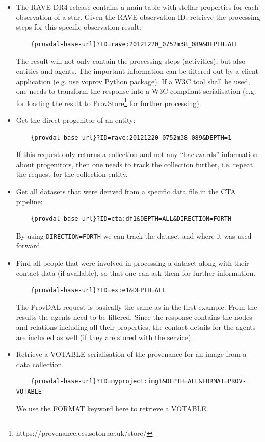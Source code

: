 \begin{itemize}
\item The RAVE DR4 release contains a main table with stellar properties for each observation of a star. Given the RAVE observation ID, retrieve the processing steps
for this specific observation result:

	\begin{verbatim}
	{provdal-base-url}?ID=rave:20121220_0752m38_089&DEPTH=ALL
	\end{verbatim}

The result will not only contain the processing steps (activities), but also entities and agents. The important information can be filtered out by a client application (e.g. use voprov Python package). If a W3C tool shall be used, one needs to transform the response into a W3C compliant serialisation (e.g. for loading the result to ProvStore\footnote{https://provenance.ecs.soton.ac.uk/store/} for further processing).

\item Get the direct progenitor of an entity:
	\begin{verbatim}
	{provdal-base-url}?ID=rave:20121220_0752m38_089&DEPTH=1
	\end{verbatim}
	If this request only returns a collection and not any ``backwards'' information about progenitors, then
	one needs to track the collection further, i.e. repeat the request for the collection entity.

\item Get all datasets that were derived from a specific data file in the CTA pipeline:
	\begin{verbatim}
	{provdal-base-url}?ID=cta:df1&DEPTH=ALL&DIRECTION=FORTH
	\end{verbatim}
	By using \texttt{DIRECTION=FORTH} we can track the dataset and where it was used forward.

\item Find all people that were involved in processing a dataset along with their contact data (if available), so that one can ask them for further information.
	\begin{verbatim}
	{provdal-base-url}?ID=ex:e1&DEPTH=ALL
	\end{verbatim}
 	The ProvDAL request is basically the same as in the first example. From the results the agents need to be filtered.
 	Since the response contains the nodes and relations including all their properties, the contact details for the agents are included as well (if they are stored with the service).

\item Retrieve a VOTABLE serialisation of the provenance for an image from a data collection.
	\begin{verbatim}
	{provdal-base-url}?ID=myproject:img1&DEPTH=ALL&FORMAT=PROV-VOTABLE
	\end{verbatim}
	We use the FORMAT keyword here to retrieve a VOTABLE.
\end{itemize}

